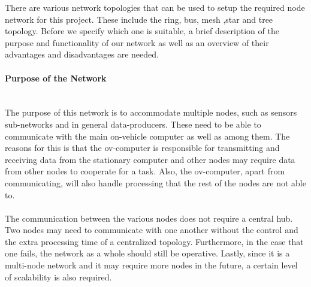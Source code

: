 There are various network topologies that can be used to setup the required node network for this project.
These include the ring, bus, mesh ,star and tree topology. Before we specify which one is suitable, a brief description of the purpose and functionality of our network as well as an overview of their advantages and disadvantages are needed. 

\paragraph{Purpose of the Network}~\\
The purpose of this network is to accommodate multiple nodes, such as sensors sub-networks and in general data-producers.
These need to be able to communicate with the main on-vehicle computer as well as among them.
The reasons for this is that the ov-computer is responsible for transmitting and receiving data from the stationary computer and other nodes may require data from other nodes to cooperate for a task.
Also, the ov-computer, apart from communicating, will also handle processing that the rest of the nodes are not able to. 
\\\\
The communication between the various nodes does not require a central hub.
Two nodes may need to communicate with one another without the control and the extra processing time of a centralized topology.
Furthermore, in the case that one fails, the network as a whole should still be operative.
Lastly, since it is a multi-node network and it may require more nodes in the future, a certain level of scalability is also required.

